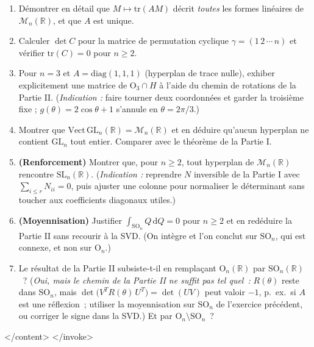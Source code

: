 \begin{mdframed}[style=exobar]
  \begin{enumerate}
    \item Démontrer en détail que $M\mapsto\mathrm{tr}(AM)$ décrit \emph{toutes}
          les formes linéaires de $\mathcal{M}_n(\mathbb{R})$, et que $A$ est unique.

    \item Calculer $\det C$ pour la matrice de permutation cyclique
          $\gamma=(1\,2\,\cdots\,n)$ et vérifier $\mathrm{tr}(C)=0$ pour $n\geq 2$.

    \item Pour $n=3$ et $A = \mathrm{diag}(1,1,1)$ (hyperplan de trace nulle),
          exhiber explicitement une matrice de $\mathrm{O}_3 \cap H$ à l'aide du
          chemin de rotations de la Partie II. (\textit{Indication :} faire
          tourner deux coordonnées et garder la troisième fixe ;
          $g(\theta) = 2\cos\theta + 1$ s'annule en $\theta = 2\pi/3$.)

    \item Montrer que $\mathrm{Vect}\,\mathrm{GL}_n(\mathbb{R}) = \mathcal{M}_n(\mathbb{R})$
          et en déduire qu'aucun hyperplan ne contient $\mathrm{GL}_n$ tout entier.
          Comparer avec le théorème de la Partie I.

    \item \textbf{(Renforcement)} Montrer que, pour $n\geq 2$, tout hyperplan de
          $\mathcal{M}_n(\mathbb{R})$ rencontre $\mathrm{SL}_n(\mathbb{R})$.
          (\textit{Indication :} reprendre $N$ inversible de la Partie I avec
          $\sum_{i\leq r} N_{ii}=0$, puis ajuster une colonne pour normaliser le
          déterminant sans toucher aux coefficients diagonaux utiles.)

    \item \textbf{(Moyennisation)} Justifier $\int_{\mathrm{SO}_n} Q\,\mathrm{d}Q = 0$
          pour $n\geq 2$ et en redéduire la Partie II sans recourir à la SVD.
          (On intègre et l'on conclut sur $\mathrm{SO}_n$, qui est connexe,
          et non sur $\mathrm{O}_n$.)

    \item Le résultat de la Partie II subsiste-t-il en remplaçant $\mathrm{O}_n(\mathbb{R})$
          par $\mathrm{SO}_n(\mathbb{R})$~? (\textit{Oui, mais le chemin de la
          Partie II ne suffit pas tel quel~:} $R(\theta)$ reste dans
          $\mathrm{SO}_n$, mais $\det\bigl(V^T R(\theta)\, U^T\bigr)
          = \det(UV)$ peut valoir $-1$, p.~ex.\ si $A$ est une réflexion~;
          utiliser la moyennisation sur $\mathrm{SO}_n$ de l'exercice
          précédent, ou corriger le signe dans la SVD.) Et par
          $\mathrm{O}_n \setminus \mathrm{SO}_n$~?
  \end{enumerate}
\end{mdframed}

</content>
</invoke>
